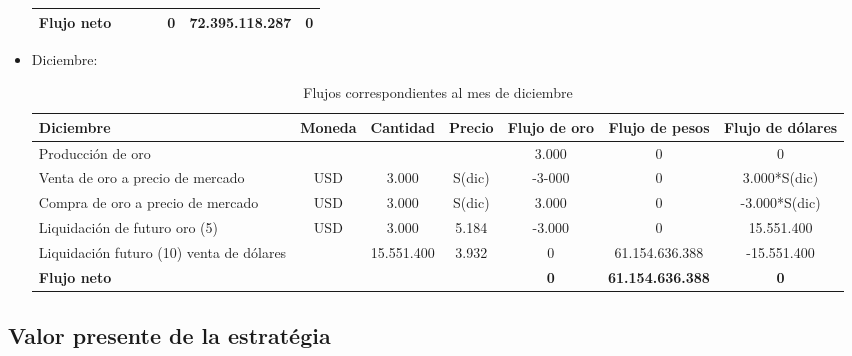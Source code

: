 \documentclass{article}
\theoremstyle{remark}
\theoremstyle{definition}
\begin{document}
\begin{itemize}
\begin{table}[H]
\begin{tabular}{l|c c c|c c c}
\midrule

\textbf{Flujo neto} 
& \textbf{} 
& \textbf{} 
& \textbf{} 
& \textbf{0} 
& \textbf{72.395.118.287} 
& \textbf{0} \\

\bottomrule
\end{tabular}
\end{table}

\item Diciembre:

\begin{table}[H]
\centering
\caption{Flujos correspondientes al mes de diciembre}
\footnotesize
\renewcommand{\arraystretch}{1.2}

\begin{tabular}{l|c c c|c c c}
\toprule
\textbf{Diciembre} & 
\textbf{Moneda} & 
\textbf{Cantidad} & 
\textbf{Precio} & 
\textbf{Flujo de oro} & 
\textbf{Flujo de pesos} & 
\textbf{Flujo de dólares} \\
\midrule

Producción de oro 
&  &  &  & 3.000 & 0 & 0 \\

Venta de oro a precio de mercado 
& USD & 3.000 & S(dic) & -3-000 & 0 & 3.000*S(dic) \\

Compra de oro a precio de mercado 
& USD & 3.000 & S(dic) & 3.000 & 0 & -3.000*S(dic) \\

Liquidación de futuro oro (5) 
& USD & 3.000 & 5.184 & -3.000 & 0 & 15.551.400 \\

Liquidación futuro (10) venta de dólares 
&  & 15.551.400 & 3.932 & 0 & 61.154.636.388 & -15.551.400 \\

\midrule

\textbf{Flujo neto} 
& \textbf{} 
& \textbf{} 
& \textbf{} 
& \textbf{0} 
& \textbf{61.154.636.388} 
& \textbf{0} \\

\bottomrule
\end{tabular}
\end{table}
     
 \end{itemize}

 \subsection{Valor presente de la estratégia}
\end{document}
